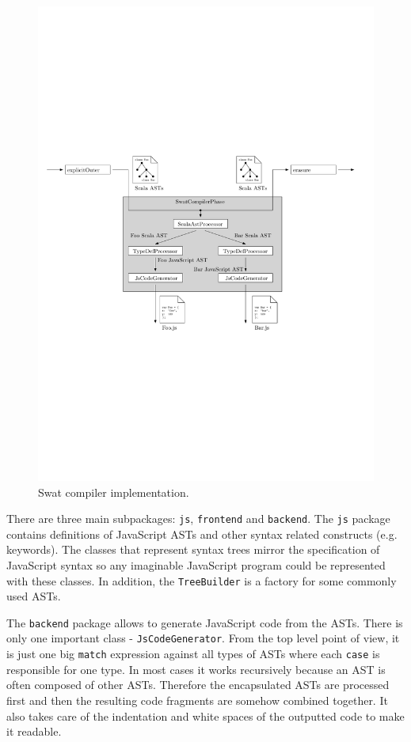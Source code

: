 \documentclass[12pt,a4paper]{report}
\begin{document}
\begin{figure}[ht]
  \centering
	\includegraphics[width=\linewidth,height=\textheight,keepaspectratio]{img/SwatCompiler.pdf}
	\caption{Swat compiler implementation.}
	\label{SwatCompiler}
\end{figure}

There are three main subpackages: \texttt{js}, \texttt{frontend} and \texttt{backend}. The \texttt{js} package contains definitions of JavaScript ASTs and other syntax related constructs (e.g. keywords). The classes that represent syntax trees mirror the specification of JavaScript syntax \cite{EcmaScript} so any imaginable JavaScript program could be represented with these classes. In addition, the \texttt{TreeBuilder} is a factory for some commonly used ASTs.

The \texttt{backend} package allows to generate JavaScript code from the ASTs. There is only one important class - \texttt{JsCodeGenerator}. From the top level point of view, it is just one big \texttt{match} expression against all types of ASTs where each \texttt{case} is responsible for one type. In most cases it works recursively because an AST is often composed of other ASTs. Therefore the encapsulated ASTs are processed first and then the resulting code fragments are somehow combined together. It also takes care of the indentation and white spaces of the outputted code to make it readable.
\end{document}
